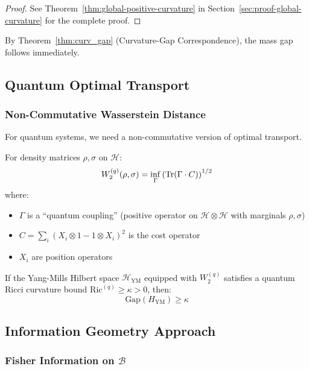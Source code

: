\begin{proof}
See Theorem~\ref{thm:global-positive-curvature} in Section~\ref{sec:proof-global-curvature} 
for the complete proof.
\end{proof}

\begin{corollary}
By Theorem~\ref{thm:curv_gap} (Curvature-Gap Correspondence), the mass gap follows immediately.
\end{corollary}

\subsection{Quantum Optimal Transport}

\subsubsection{Non-Commutative Wasserstein Distance}

For quantum systems, we need a non-commutative version of optimal transport.

\begin{definition}
For density matrices $\rho, \sigma$ on $\mathcal{H}$:
\[
W_2^{(q)}(\rho, \sigma) = \inf_{\Gamma} \left(\operatorname{Tr}(\Gamma \cdot C)\right)^{1/2}
\]
where:
\begin{itemize}
\item $\Gamma$ is a ``quantum coupling'' (positive operator on $\mathcal{H} \otimes \mathcal{H}$ with marginals $\rho, \sigma$)
\item $C = \sum_i (X_i \otimes 1 - 1 \otimes X_i)^2$ is the cost operator
\item $X_i$ are position operators
\end{itemize}
\end{definition}

\begin{theorem}
If the Yang-Mills Hilbert space $\mathcal{H}_{\text{YM}}$ equipped with $W_2^{(q)}$ satisfies a quantum Ricci curvature bound $\text{Ric}^{(q)} \geq \kappa > 0$, then:
\[
\text{Gap}(H_{\text{YM}}) \geq \kappa
\]
\end{theorem}

\subsection{Information Geometry Approach}

\subsubsection{Fisher Information on $\mathcal{B}$}

